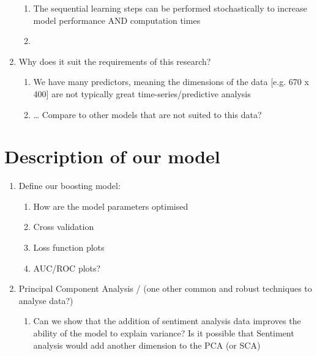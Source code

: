 \documentclass{article}
\begin{document}
\begin{enumerate}
\begin{enumerate}
\item The sequential learning steps can be performed stochastically to increase model performance AND computation times
\label{sec-4-2-5}

\item 
\label{sec-4-2-6}
\end{enumerate}

\item Why does it suit the requirements of this research?
\label{sec-4-3}

\begin{enumerate}
\item We have many predictors, meaning the dimensions of the data [e.g. 670 x 400] are not typically great time-series/predictive analysis
\label{sec-4-3-1}

\item \ldots{} Compare to other models that are not suited to this data?
\label{sec-4-3-2}
\end{enumerate}
\end{enumerate}


\section{Description of our model}
\label{sec-5}

\begin{enumerate}
\item Define our boosting model:
\label{sec-5-1}

\begin{enumerate}
\item How are the model parameters optimised
\label{sec-5-1-1}

\item Cross validation
\label{sec-5-1-2}

\item Loss function plots
\label{sec-5-1-3}

\item AUC/ROC plots?
\label{sec-5-1-4}
\end{enumerate}

\item Principal Component Analysis / (one other common and robust techniques to analyse data?)
\label{sec-5-2}

\begin{enumerate}
\item Can we show that the addition of sentiment analysis data improves the ability of the model to explain variance?
\label{sec-5-2-1}
Is it possible that Sentiment analysis would add another dimension to the PCA (or SCA)
\end{enumerate}
\end{enumerate}
\end{document}
